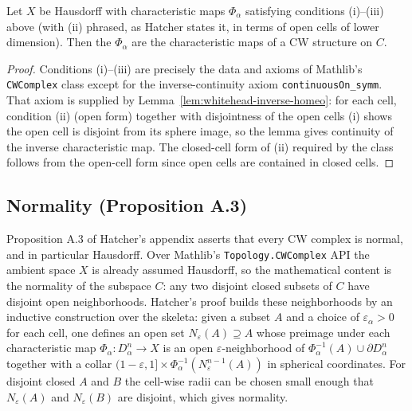 \begin{proposition}
    \label{prop:whitehead-cw}
    \leanok
    Let $X$ be Hausdorff with characteristic maps $\Phi_\alpha$ satisfying
    conditions (i)--(iii) above (with (ii) phrased, as Hatcher states it, in
    terms of open cells of lower dimension). Then the $\Phi_\alpha$ are the
    characteristic maps of a CW structure on $C$.
\end{proposition}
\begin{proof}
    Conditions (i)--(iii) are precisely the data and axioms of Mathlib's
    \texttt{CWComplex} class except for the inverse-continuity axiom
    \texttt{continuousOn\_symm}. That axiom is supplied by
    Lemma~\ref{lem:whitehead-inverse-homeo}: for each cell, condition (ii) (open
    form) together with disjointness of the open cells (i) shows the open cell is
    disjoint from its sphere image, so the lemma gives continuity of the inverse
    characteristic map. The closed-cell form of (ii) required by the class
    follows from the open-cell form since open cells are contained in closed
    cells.
\end{proof}

\subsection{Normality (Proposition A.3)}

Proposition A.3 of Hatcher's appendix asserts that every CW complex is normal,
and in particular Hausdorff. Over Mathlib's \texttt{Topology.CWComplex} API the
ambient space $X$ is already assumed Hausdorff, so the mathematical content is
the normality of the subspace $C$: any two disjoint closed subsets of $C$ have
disjoint open neighborhoods. Hatcher's proof builds these neighborhoods by an
inductive construction over the skeleta: given a subset $A$ and a choice of
$\varepsilon_\alpha > 0$ for each cell, one defines an open set
$N_\varepsilon(A) \supseteq A$ whose preimage under each characteristic map
$\Phi_\alpha : D^n_\alpha \to X$ is an open $\varepsilon$-neighborhood of
$\Phi_\alpha^{-1}(A) \cup \partial D^n_\alpha$ together with a collar
$(1-\varepsilon, 1] \times \Phi_\alpha^{-1}(N_\varepsilon^{n-1}(A))$ in spherical
coordinates. For disjoint closed $A$ and $B$ the cell-wise radii can be chosen
small enough that $N_\varepsilon(A)$ and $N_\varepsilon(B)$ are disjoint, which
gives normality.

